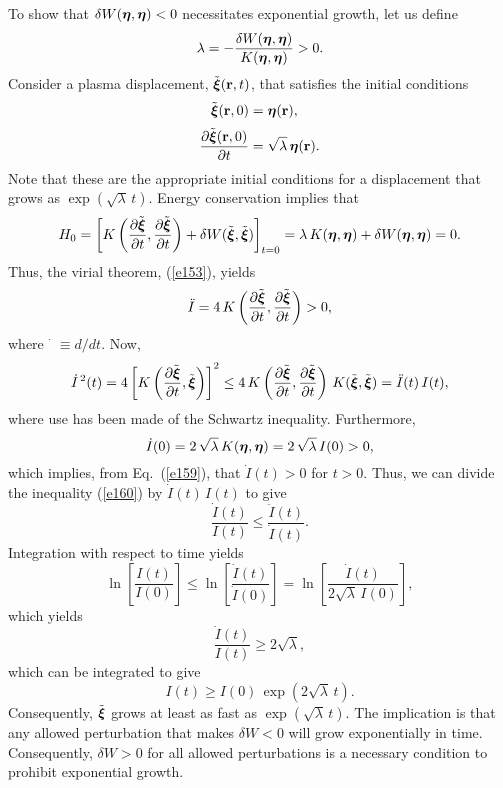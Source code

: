 \documentclass[12pt,prb,aps,notitlepage]{revtex4-1}
\newcommand{\bxi}{\mbox{\boldmath$\xi$}}
\newcommand{\bta}{\mbox{\boldmath$\eta$}}
\begin{document}
To show that $\delta W(\bta,\bta)<0$ necessitates exponential growth, let us define 
\begin{equation}
\lambda = -\frac{\delta W(\bta,\bta)}{K(\bta,\bta)} > 0.
\end{equation}
Consider a plasma displacement, $\tilde{\bxi}({\bf r},t)$, that satisfies the initial conditions
\begin{align}
\tilde{\bxi}({\bf r},0)&= \bta({\bf r}),\\[0.5ex]
\frac{\partial\tilde{\bxi}({\bf r},0)}{\partial t}&= \sqrt{\lambda}\,\bta({\bf r}).
\end{align}
Note that these are the appropriate initial conditions for a displacement that grows as $\exp(\sqrt{\lambda}\,t)$.
Energy conservation implies that
\begin{equation}
H_0 = \left[K\left(\frac{\partial\tilde{\bxi}}{\partial t},\frac{\partial\tilde{\bxi}}{\partial t}\right) + \delta W(\tilde{\bxi},\tilde{\bxi})\right]_{t=0}= \lambda\,K(\bta,\bta) 
+\delta W(\bta,\bta)=0.
\end{equation}
Thus, the virial theorem, (\ref{e153}), yields
\begin{equation}\label{e159}
\ddot{I}= 4\,K\left(\frac{\partial\tilde{\bxi}}{\partial t}, 
\frac{\partial\tilde{\bxi}}{\partial t}\right) > 0,
\end{equation}
where $\dot{\phantom{a}}\equiv d/dt$. Now,
\begin{equation}\label{e160}
\dot{I}^{\,2}(t) = 4\left[K\left(\frac{\partial\tilde{\bxi}}{\partial t}, 
\tilde{\bxi}\right)\right]^2 \leq 4\,K\left(\frac{\partial\tilde{\bxi}}{\partial t}, \frac{\partial\tilde{\bxi}}{\partial t}\right)\,K(\tilde{\bxi},\tilde{\bxi}) = \ddot{I}(t)\,I(t),
\end{equation}
where use has been made of the Schwartz inequality. Furthermore,
\begin{equation}
\dot{I}(0) = 2\,\sqrt{\lambda}\,K(\bta,\bta)=2\,\sqrt{\lambda}\,I(0) >0,
\end{equation}
which implies, from Eq.~(\ref{e159}), that $\dot{I}(t)>0$ for $t>0$. Thus, we can divide the inequality (\ref{e160}) by $\dot{I}(t)\,I(t)$ to give
\begin{equation}
\frac{\dot{I}(t)}{I(t)} \leq \frac{\ddot{I}(t)}{\dot{I}(t)}.
\end{equation}
Integration with respect to time yields
\begin{equation}
\ln\left[\frac{I(t)}{I(0)}\right] \leq \ln \left[\frac{\dot{I}(t)}{\dot{I}(0)}\right]= \ln\left[\frac{\dot{I}(t)}{2\sqrt{\lambda}\,I(0)}\right],
\end{equation}
which yields
\begin{equation}
\frac{\dot{I}(t)}{I(t)}\geq 2\sqrt{\lambda},
\end{equation}
which can be integrated to give
\begin{equation}
I(t) \geq I(0)\,\exp\left(2\sqrt{\lambda}\,t\right).
\end{equation}
Consequently, $\tilde{\bxi}$ grows at least as fast as $\exp(\sqrt{\lambda}\,t)$. 
The implication is that any allowed perturbation that makes $\delta W<0$ will grow exponentially in time. Consequently, $\delta W>0$ for all
allowed perturbations is a necessary condition to prohibit exponential growth. 
\end{document}
